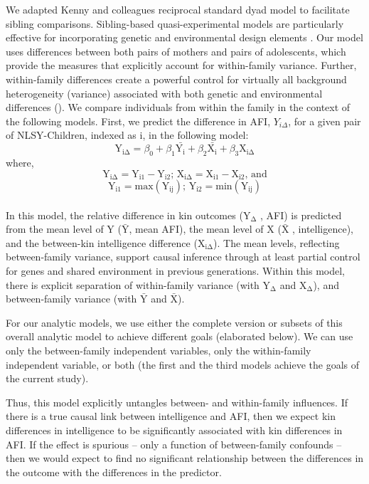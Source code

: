 We adapted Kenny and colleagues \citeyearpar{kenny2001social,kenny2006dyadic} reciprocal standard dyad model to facilitate sibling comparisons. Sibling-based quasi-experimental models are particularly effective for incorporating genetic and environmental design elements \citep{Lahey2010,Rutter2007}. Our model uses differences between both pairs of mothers and pairs of adolescents, which provide the measures that explicitly account for within-family variance. Further, within-family differences create a powerful control for virtually all background heterogeneity (variance) associated with both genetic and environmental differences (\citeauthor{Lahey2010}). We compare individuals from within the family in the context of the following models. First, we predict the difference in AFI, $Y_{i\Delta}$, for a given pair of NLSY-Children, indexed as i, in the following model:
\begin{equation}\label{equation_discord_main}
\mathrm{Y_{i\Delta}} = \beta_0 + \beta_1\mathrm{\bar{Y_{i}}} + \beta_2\mathrm{\bar{X_{i}}} + \beta_3\mathrm{X_{i\Delta}}
\end{equation}\vspace{-10pt}
where,
\begin{equation}\label{equation_discord_defs_delta}
\mathrm{Y_{i\Delta}} = \mathrm{Y_{i1}} - \mathrm{Y_{i2}};\, \mathrm{X_{i\Delta}} = \mathrm{X_{i1}} - \mathrm{X_{i2}},\, \mathrm{and}
\end{equation}
\begin{equation}\label{equation_discord_defs_min}
\mathrm{Y_{i1}} = \mathrm{max}(\mathrm{Y_{ij}});\, \mathrm{Y_{i2}} = \mathrm{min}(\mathrm{Y_{ij}})
\end{equation}\\

In this model, the relative difference in kin outcomes ($\mathrm{Y_{\Delta}}$ \eg, AFI) is predicted from the mean level of Y ($\mathrm{\bar{Y}}$, \eg mean AFI), the mean level of X ($\mathrm{\bar{X}}$ \eg, intelligence), and the between-kin intelligence difference ($\mathrm{X_{i\Delta}}$). The mean levels, reflecting between-family variance, support causal inference through at least partial control for genes and shared environment in previous generations. Within this model, there is explicit separation of within-family variance (with $\mathrm{Y_{\Delta}}$ and $\mathrm{X_{\Delta}}$), and between-family variance (with $\mathrm{\bar{Y}}$ and $\mathrm{\bar{X}}$).

For our analytic models, we use either the complete version or subsets of this overall analytic model to achieve different goals (elaborated below).  We can use only the between-family independent variables, only the within-family independent variable, or both (the first and the third models achieve the goals of the current study).

Thus, this model explicitly untangles between- and within-family influences. If there is a true causal link between intelligence and AFI, then we expect kin differences in intelligence to be significantly associated with kin differences in AFI. If the effect is spurious -- only a function of between-family confounds -- then we would expect to find no significant relationship between the differences in the outcome with the differences in the predictor.